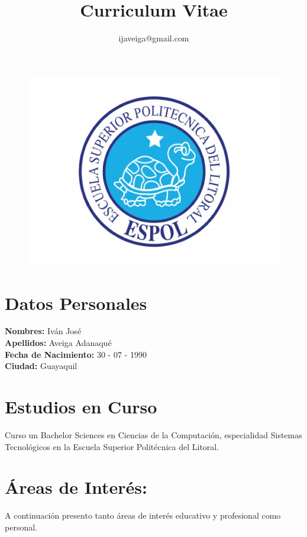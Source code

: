 \documentclass[a4paper,11pt]{article}
\title{\bf{Curriculum Vitae}}
\author{ijaveiga@gmail.com}
\begin{document}
\maketitle
\begin{figure}[h]
\centering
\includegraphics[width=0.6\linewidth]{logo}
\end{figure}
\lhead{}
\newpage
\section{\textbf{Datos Personales}}
\noindent
\textbf{Nombres:} \hspace{59mm}  Iván José \\ 
\textbf{Apellidos:} \hspace{58mm}  Aveiga Adanaqué \\ 
\textbf{Fecha de Nacimiento:} \hspace{36mm}  30 - 07 - 1990 \\ 
\textbf{Ciudad:} \hspace{62mm} Guayaquil \\ 

\section{\textbf{Estudios en Curso}}
\noindent
Curso un Bachelor Sciences en Ciencias de la Computación, especialidad Sistemas Tecnológicos en la
Escuela Superior Politécnica del Litoral.

\section{\textbf{Áreas de Interés:}}
\noindent
A continuación presento tanto áreas de interés educativo y profesional como personal.
\end{document}
